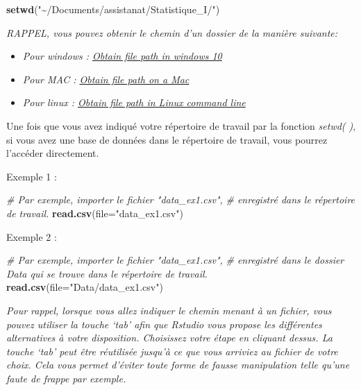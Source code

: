 \documentclass[
]{book}
\newenvironment{Shaded}{\begin{snugshade}}{\end{snugshade}}
\newcommand{\AttributeTok}[1]{\textcolor[rgb]{0.13,0.29,0.53}{#1}}
\newcommand{\CommentTok}[1]{\textcolor[rgb]{0.56,0.35,0.01}{\textit{#1}}}
\newcommand{\FunctionTok}[1]{\textcolor[rgb]{0.13,0.29,0.53}{\textbf{#1}}}
\newcommand{\NormalTok}[1]{#1}
\newcommand{\StringTok}[1]{\textcolor[rgb]{0.31,0.60,0.02}{#1}}
\begin{document}
\begin{Shaded}
\begin{Highlighting}[]
\FunctionTok{setwd}\NormalTok{(}\StringTok{"\textasciitilde{}/Documents/assistanat/Statistique\_I/"}\NormalTok{)}
\end{Highlighting}
\end{Shaded}

\emph{RAPPEL, vous pouvez obtenir le chemin d'un dossier de la manière suivante:}

\begin{itemize}
\item
  \emph{Pour windows : \href{https://www.supportyourtech.com/articles/how-to-get-file-path-windows-10-easy-steps-to-find-your-file-locations/}{Obtain file path in windows 10}}
\item
  \emph{Pour MAC : \href{https://macpaw.com/how-to/get-file-path-mac}{Obtain file path on a Mac}}
\item
  \emph{Pour linux : \href{https://linuxhandbook.com/get-file-path/}{Obtain file path in Linux command line}}
\end{itemize}

Une fois que vous avez indiqué votre répertoire de travail par la fonction \emph{setwd( )}, si vous avez une base de données dans le répertoire de travail, vous pourrez l'accéder directement.

Exemple 1 :

\begin{Shaded}
\begin{Highlighting}[]
\CommentTok{\# Par exemple, importer le fichier "data\_ex1.csv", }
\CommentTok{\# enregistré dans le répertoire de travail.}
\FunctionTok{read.csv}\NormalTok{(}\AttributeTok{file=}\StringTok{"data\_ex1.csv"}\NormalTok{)}
\end{Highlighting}
\end{Shaded}

Exemple 2 :

\begin{Shaded}
\begin{Highlighting}[]

\CommentTok{\# Par exemple, importer le fichier "data\_ex1.csv", }
\CommentTok{\# enregistré dans le dossier Data qui se trouve dans le répertoire de travail.}
\FunctionTok{read.csv}\NormalTok{(}\AttributeTok{file=}\StringTok{"Data/data\_ex1.csv"}\NormalTok{)}
\end{Highlighting}
\end{Shaded}

\emph{Pour rappel, lorsque vous allez indiquer le chemin menant à un fichier, vous pouvez utiliser la touche `tab' afin que Rstudio vous propose les différentes alternatives à votre disposition. Choisissez votre étape en cliquant dessus. La touche `tab' peut être réutilisée jusqu'à ce que vous arriviez au fichier de votre choix. Cela vous permet d'éviter toute forme de fausse manipulation telle qu'une faute de frappe par exemple.}
\end{document}
